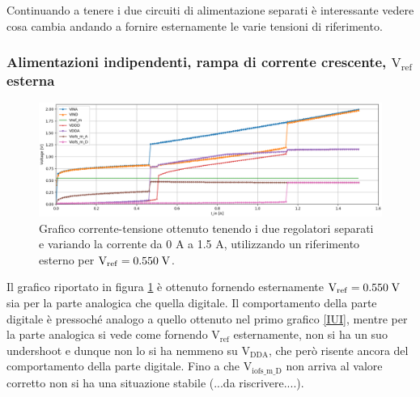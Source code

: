 Continuando a tenere i due circuiti di alimentazione separati è interessante vedere cosa cambia andando a fornire esternamente le varie tensioni di riferimento.

\subsubsection{Alimentazioni indipendenti, rampa di corrente crescente, $\mathrm{V_{ref}}$ esterna} 
\begin{figure}
\centering
\includegraphics[scale=.3]{Immagini/IUEVref2}
\caption{Grafico corrente-tensione ottenuto tenendo i due regolatori separati e variando la corrente da 0 A a 1.5 A, utilizzando un riferimento esterno per $\mathrm{V_{ref}}=0.550 \rm \; V$.}
\label{IUEVref}
\end{figure}
Il grafico riportato in figura \ref{IUEVref} è ottenuto fornendo esternamente  $\mathrm{V_{ref}}=0.550 \rm \; V$  sia per la parte analogica che quella digitale. Il comportamento della parte digitale è pressoché analogo a quello ottenuto nel primo grafico \ref{IUI}, mentre per la parte analogica si vede come fornendo $\mathrm{V_{ref}}$ esternamente, non si ha un suo undershoot e dunque non lo si ha nemmeno su $\mathrm{V_{DDA}}$, che però risente ancora del comportamento della parte digitale. Fino a che $\mathrm{V_{iofs\_ m \_ D}}$ non arriva al valore corretto non si ha una situazione stabile (...da riscrivere....).

% 
%
%


